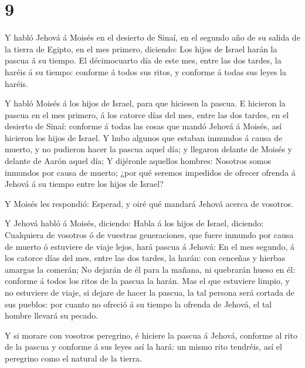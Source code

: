 \hypertarget{section-8}{%
\section{9}\label{section-8}}

 Y habló Jehová á Moisés en el desierto de Sinaí, en el
segundo año de su salida de la tierra de Egipto, en el mes primero,
diciendo:  Los hijos de Israel harán la pascua á su tiempo.
 El décimocuarto día de este mes, entre las dos tardes, la
haréis á su tiempo: conforme á todos sus ritos, y conforme á todas sus
leyes la haréis.

 Y habló Moisés á los hijos de Israel, para que hiciesen la
pascua.  E hicieron la pascua en el mes primero, á los
catorce días del mes, entre las dos tardes, en el desierto de Sinaí:
conforme á todas las cosas que mandó Jehová á Moisés, así hicieron los
hijos de Israel.  Y hubo algunos que estaban inmundos á
causa de muerto, y no pudieron hacer la pascua aquel día; y llegaron
delante de Moisés y delante de Aarón aquel día;  Y dijéronle
aquellos hombres: Nosotros somos inmundos por causa de muerto; ¿por qué
seremos impedidos de ofrecer ofrenda á Jehová á su tiempo entre los
hijos de Israel?

 Y Moisés les respondió: Esperad, y oiré qué mandará Jehová
acerca de vosotros.

 Y Jehová habló á Moisés, diciendo:  Habla á
los hijos de Israel, diciendo: Cualquiera de vosotros ó de vuestras
generaciones, que fuere inmundo por causa de muerto ó estuviere de viaje
lejos, hará pascua á Jehová:  En el mes segundo, á los
catorce días del mes, entre las dos tardes, la harán: con cenceñas y
hierbas amargas la comerán;  No dejarán de él para la
mañana, ni quebrarán hueso en él: conforme á todos los ritos de la
pascua la harán.  Mas el que estuviere limpio, y no
estuviere de viaje, si dejare de hacer la pascua, la tal persona será
cortada de sus pueblos: por cuanto no ofreció á su tiempo la ofrenda de
Jehová, el tal hombre llevará su pecado.

 Y si morare con vosotros peregrino, é hiciere la pascua á
Jehová, conforme al rito de la pascua y conforme á sus leyes así la
hará: un mismo rito tendréis, así el peregrino como el natural de la
tierra.

